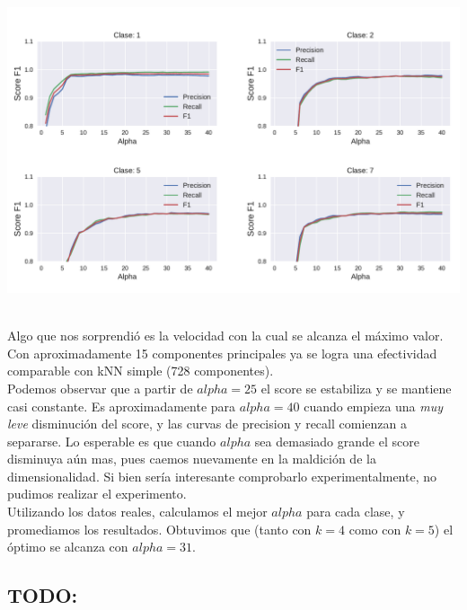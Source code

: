 {\centering
    \includegraphics[scale=0.65]{informe/imagenes/pca/variacionAlphaClases1257KFijo.pdf} \\
}
$ $\newline

Algo que nos sorprendió es la velocidad con la cual se alcanza el máximo valor. Con aproximadamente 15 componentes principales ya se logra una efectividad comparable con kNN simple (728 componentes). \\

Podemos observar que a partir de $alpha=25$ el score se estabiliza y se mantiene casi constante. Es aproximadamente para $alpha=40$ cuando empieza una \textit{muy leve} disminución del score, y las curvas de precision y recall comienzan a separarse. Lo esperable es que cuando $alpha$ sea demasiado grande el score disminuya aún mas, pues caemos nuevamente en la maldición de la dimensionalidad. Si bien sería interesante comprobarlo experimentalmente, no pudimos realizar el experimento. \\

Utilizando los datos reales, calculamos el mejor $alpha$ para cada clase, y promediamos los resultados. Obtuvimos que (tanto con $k=4$ como con $k=5$) el óptimo se alcanza con $alpha=31$. \\

\subsection{TODO:}




